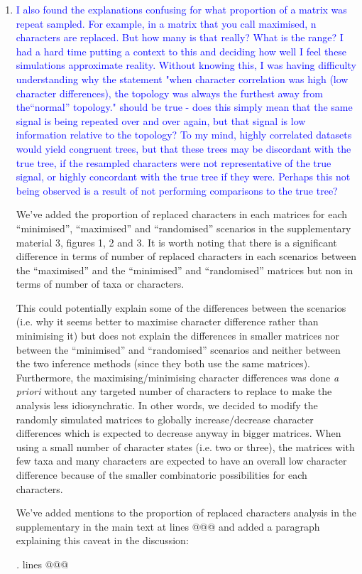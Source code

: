 \documentclass[12pt,letterpaper]{article}
\begin{document}
\begin{enumerate}
\item{\textcolor{blue}{I also found the explanations confusing for what proportion of a matrix was repeat sampled. For example, in a matrix that you call maximised, n characters are replaced. But how many is that really? What is the range? I had a hard time putting a context to this and deciding how well I feel these simulations approximate reality.  Without knowing this, I was having difficulty understanding why the statement "when character correlation was high (low character differences), the topology was always the furthest away from the``normal'' topology." 
should be true - does this simply mean that the same signal is being repeated over and over again, but that signal is low information relative to the topology? To my mind, highly correlated datasets would yield congruent trees, but that these trees may be discordant with the true tree, if the resampled characters were not representative of the true signal, or highly concordant with the true tree if they were. Perhaps this not being observed is a result of not performing comparisons to the true tree?}}

We've added the proportion of replaced characters in each matrices for each ``minimised'', ``maximised'' and ``randomised'' scenarios in the supplementary material 3, figures 1, 2 and 3.
It is worth noting that there is a significant difference in terms of number of replaced characters in each scenarios between the ``maximised'' and the ``minimised'' and ``randomised'' matrices but non in terms of number of taxa or characters.

This could potentially explain some of the differences between the scenarios (i.e. why it seems better to maximise character difference rather than minimising it) but does not explain the differences in smaller matrices nor between the ``minimised'' and ``randomised'' scenarios and neither between the two inference methods (since they both use the same matrices).
Furthermore, the maximising/minimising character differences was done \textit{a priori} without any targeted number of characters to replace to make the analysis less idiosynchratic.
In other words, we decided to modify the randomly simulated matrices to globally increase/decrease character differences which is expected to decrease anyway in bigger matrices.
When using a small number of character states (i.e. two or three), the matrices with few taxa and many characters are expected to have an overall low character difference because of the smaller combinatoric possibilities for each characters.

We've added mentions to the proportion of replaced characters analysis in the supplementary in the main text at lines @@@ and added a paragraph explaining this caveat in the discussion:

\textit{.} lines @@@


\end{enumerate}
\end{document}
